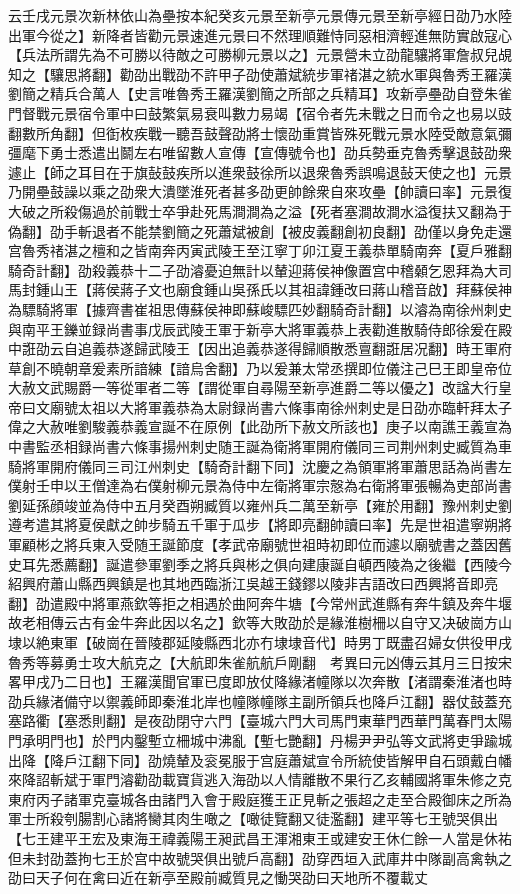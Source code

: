 云壬戌元景次新林依山為壘按本紀癸亥元景至新亭元景傳元景至新亭經日劭乃水陸出軍今從之】新降者皆勸元景速進元景曰不然理順難恃同惡相濟輕進無防實啟寇心【兵法所謂先為不可勝以待敵之可勝柳元景以之】元景營未立劭龍驤將軍詹叔兒覘知之【驤思將翻】勸劭出戰劭不許甲子劭使蕭斌統步軍禇湛之統水軍與魯秀王羅漢劉簡之精兵合萬人【史言唯魯秀王羅漢劉簡之所部之兵精耳】攻新亭壘劭自登朱雀門督戰元景宿令軍中曰鼓繁氣易衰叫數力易竭【宿令者先未戰之日而令之也易以豉翻數所角翻】但衘枚疾戰一聽吾鼓聲劭將士懷劭重賞皆殊死戰元景水陸受敵意氣彌彊麾下勇士悉遣出鬬左右唯留數人宣傳【宣傳號令也】劭兵勢垂克魯秀擊退鼓劭衆遽止【師之耳目在于旗鼔鼓疾所以進衆鼓徐所以退衆魯秀誤鳴退鼔天使之也】元景乃開壘鼓譟以乘之劭衆大潰墜淮死者甚多劭更帥餘衆自來攻壘【帥讀曰率】元景復大破之所殺傷過於前戰士卒爭赴死馬澗澗為之溢【死者塞澗故澗水溢復扶又翻為于偽翻】劭手斬退者不能禁劉簡之死蕭斌被創【被皮義翻創初良翻】劭僅以身免走還宫魯秀禇湛之檀和之皆南奔丙寅武陵王至江寧丁卯江夏王義恭單騎南奔【夏戶雅翻騎奇計翻】劭殺義恭十二子劭濬憂迫無計以輦迎蔣侯神像置宫中稽顙乞恩拜為大司馬封鍾山王【蔣侯蔣子文也廟食鍾山吳孫氏以其祖諱鍾改曰蔣山稽音啟】拜蘇侯神為驃騎將軍【據齊書崔祖思傳蘇侯神即蘇峻驃匹妙翻騎奇計翻】以濬為南徐州刺史與南平王鑠並録尚書事戊辰武陵王軍于新亭大將軍義恭上表勸進散騎侍郎徐爰在殿中誑劭云自追義恭遂歸武陵王【因出追義恭遂得歸順散悉亶翻誑居况翻】時王軍府草創不曉朝章爰素所諳練【諳烏舍翻】乃以爰兼太常丞撰即位儀注己巳王即皇帝位大赦文武賜爵一等從軍者二等【謂從軍自尋陽至新亭進爵二等以優之】改諡大行皇帝曰文廟號太祖以大將軍義恭為太尉録尚書六條事南徐州刺史是日劭亦臨軒拜太子偉之大赦唯劉駿義恭義宣誕不在原例【此劭所下赦文所該也】庚子以南譙王義宣為中書監丞相録尚書六條事揚州刺史随王誕為衛將軍開府儀同三司荆州刺史臧質為車騎將軍開府儀同三司江州刺史【騎奇計翻下同】沈慶之為領軍將軍蕭思話為尚書左僕射壬申以王僧達為右僕射柳元景為侍中左衛將軍宗慤為右衛將軍張暢為吏部尚書劉延孫顔竣並為侍中五月癸酉朔臧質以雍州兵二萬至新亭【雍於用翻】豫州刺史劉遵考遣其將夏侯獻之帥步騎五千軍于瓜步【將即亮翻帥讀曰率】先是世祖遣寧朔將軍顧彬之將兵東入受随王誕節度【孝武帝廟號世祖時初即位而遽以廟號書之蓋因舊史耳先悉薦翻】誕遣參軍劉季之將兵與彬之俱向建康誕自頓西陵為之後繼【西陵今紹興府蕭山縣西興鎮是也其地西臨浙江吳越王錢鏐以陵非吉語改曰西興將音即亮翻】劭遣殿中將軍燕欽等拒之相遇於曲阿奔牛塘【今常州武進縣有奔牛鎮及奔牛堰故老相傳云古有金牛奔此因以名之】欽等大敗劭於是緣淮樹柵以自守又决破崗方山埭以絶東軍【破崗在晉陵郡延陵縣西北亦冇埭埭音代】時男丁既盡召婦女供役甲戌魯秀等募勇士攻大航克之【大航即朱雀航航戶剛翻　考異曰元凶傳云其月三日按宋畧甲戌乃二日也】王羅漢聞官軍已度即放仗降緣渚幢隊以次奔散【渚謂秦淮渚也時劭兵緣渚備守以禦義師即秦淮北岸也幢隊幢隊主副所領兵也降戶江翻】器仗鼓蓋充塞路衢【塞悉則翻】是夜劭閉守六門【臺城六門大司馬門東華門西華門萬春門太陽門承明門也】於門内鑿塹立柵城中沸亂【塹七艷翻】丹楊尹尹弘等文武將吏爭踰城出降【降戶江翻下同】劭燒輦及衮冕服于宫庭蕭斌宣令所統使皆解甲自石頭戴白幡來降詔斬斌于軍門濬勸劭載寶貨逃入海劭以人情離散不果行乙亥輔國將軍朱修之克東府丙子諸軍克臺城各由諸門入會于殿庭獲王正見斬之張超之走至合殿御床之所為軍士所殺刳腸割心諸將臠其肉生噉之【噉徒覽翻又徒濫翻】建平等七王號哭俱出【七王建平王宏及東海王禕義陽王昶武昌王渾湘東王或建安王休仁餘一人當是休祐但未封劭蓋拘七王於宫中故號哭俱出號戶高翻】劭穿西垣入武庫井中隊副高禽執之劭曰天子何在禽曰近在新亭至殿前臧質見之慟哭劭曰天地所不覆載丈